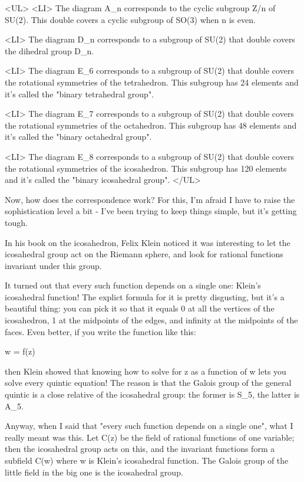 <UL>
<LI>
 The diagram A_{n} corresponds to the cyclic subgroup Z/n of SU(2).
  This double covers a cyclic subgroup of SO(3) when n is even.

<LI>
 The diagram D_{n} corresponds to a subgroup of SU(2) that double 
  covers the dihedral group D_{n}.

<LI>
 The diagram E_{6} corresponds to a subgroup of SU(2) that double
  covers the rotational symmetries of the tetrahedron.  This
  subgroup has 24 elements and it's called the "binary tetrahedral group".

<LI>
 The diagram E_{7} corresponds to a subgroup of SU(2) that double
  covers the rotational symmetries of the octahedron.  This
  subgroup has 48 elements and it's called the "binary octahedral group".

<LI>
 The diagram E_{8} corresponds to a subgroup of SU(2) that double
  covers the rotational symmetries of the icosahedron.  This
  subgroup has 120 elements and it's called the "binary icosahedral group".
</UL>

Now, how does the correspondence work?  For this, I'm afraid I have to 
raise the sophistication level a bit - I've been trying to keep things
simple, but it's getting tough.  

In his book on the icosahedron, Felix Klein noticed it was interesting 
to let the icosahedral group act on the Riemann 
sphere, and look for rational functions invariant under this group.   

It turned out that every such function depends on a single one: 
Klein's icosahedral function!  The explict formula for it is pretty
disgusting, but it's a beautiful thing: you can pick it so that it 
equals 0 at all the vertices of the icosahedron, 1 at the midpoints
of the edges, and infinity at the midpoints of the faces.  Even
better, if you write the function like this:

w = f(z)

then Klein showed that knowing how to solve for z as a function of w 
lets you solve every quintic equation!  The reason is that the Galois
group of the general quintic is a close relative of the icosahedral
group: the former is S_{5}, the latter is A_{5}.

Anyway, when I said that "every such function depends 
on a single one",
what I really meant was this.  Let C(z) be the field of rational functions
of one variable; then the icosahedral group acts on this,
and the invariant functions form a subfield C(w) where w is Klein's
icosahedral function.  The Galois group of the little field in the big
one is the icosahedral group.

